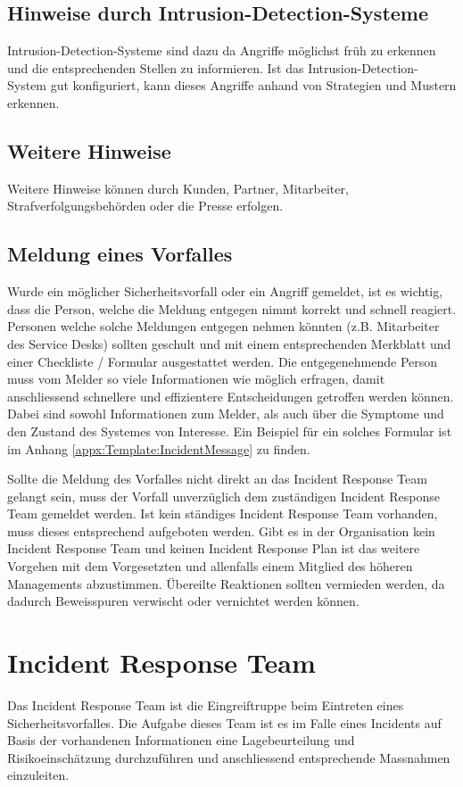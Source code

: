 \subsection{Hinweise durch Intrusion-Detection-Systeme}
Intrusion-Detection-Systeme sind dazu da Angriffe möglichst früh zu erkennen und die entsprechenden Stellen zu informieren. Ist das Intrusion-Detection-System gut konfiguriert, kann dieses Angriffe anhand von Strategien und Mustern erkennen.


\subsection{Weitere Hinweise}
Weitere Hinweise können durch Kunden, Partner, Mitarbeiter, Strafverfolgungsbehörden oder die Presse erfolgen.

\subsection{Meldung eines Vorfalles}\label{subsec:IncidentDetection:MeldungVorfall}
Wurde ein möglicher Sicherheitsvorfall oder ein Angriff gemeldet, ist es wichtig, dass die Person, welche die Meldung entgegen nimmt korrekt und schnell reagiert. Personen welche solche Meldungen entgegen nehmen könnten (z.B. Mitarbeiter des Service Desks) sollten geschult und mit einem entsprechenden Merkblatt und einer Checkliste / Formular ausgestattet werden. Die entgegenehmende Person muss vom Melder so viele Informationen wie möglich erfragen, damit anschliessend schnellere und effizientere Entscheidungen getroffen werden können. Dabei sind sowohl Informationen zum Melder, als auch über die Symptome und den Zustand des Systemes von Interesse. Ein Beispiel für ein solches Formular ist im Anhang \ref{appx:Template:IncidentMessage}  zu finden.

Sollte die Meldung des Vorfalles nicht direkt an das Incident Response Team gelangt sein, muss der Vorfall unverzüglich dem zuständigen Incident Response Team gemeldet werden. Ist kein ständiges Incident Response Team vorhanden, muss dieses entsprechend aufgeboten werden. Gibt es in der Organisation kein Incident Response Team und keinen Incident Response Plan ist das weitere Vorgehen mit dem Vorgesetzten und allenfalls einem Mitglied des höheren Managements abzustimmen. Übereilte Reaktionen sollten vermieden werden, da dadurch Beweisspuren verwischt oder vernichtet werden können. 

\section{Incident Response Team}
Das Incident Response Team ist die Eingreiftruppe beim Eintreten eines Sicherheitsvorfalles. Die Aufgabe dieses Team ist es im Falle eines Incidents auf Basis der vorhandenen Informationen eine Lagebeurteilung und Risikoeinschätzung durchzuführen und anschliessend entsprechende Massnahmen einzuleiten.


